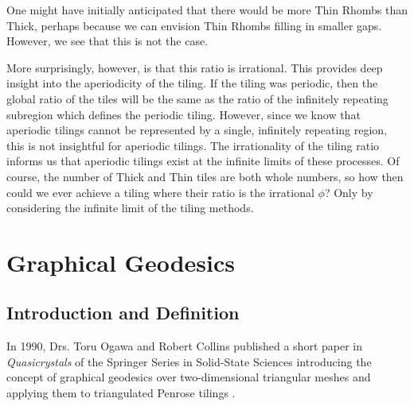 \documentclass[
  oneside,
  11pt, a4paper,
  footinclude=true,
  headinclude=true,
  cleardoublepage=empty
]{scrbook}
\begin{document}
One might have initially anticipated that there would be more Thin Rhombs than Thick, perhaps because we can envision Thin Rhombs filling in smaller gaps. However, we see that this is not the case.

More surprisingly, however, is that this ratio is irrational. This provides deep insight into the aperiodicity of the tiling. If the tiling was periodic, then the global ratio of the tiles will be the same as the ratio of the infinitely repeating subregion which defines the periodic tiling. However, since we know that aperiodic tilings cannot be represented by a single, infinitely repeating region, this is not insightful for aperiodic tilings. The irrationality of the tiling ratio informs us that aperiodic tilings exist at the infinite limits of these processes. Of course, the number of Thick and Thin tiles are both whole numbers, so how then could we ever achieve a tiling where their ratio is the irrational $\phi$? Only by considering the infinite limit of the tiling methods.
\chapter{Graphical Geodesics}
\section{Introduction and Definition}
In 1990, Drs. Toru Ogawa and Robert Collins published a short paper in \textit{Quasicrystals} of the Springer Series in Solid-State Sciences introducing the concept of graphical geodesics over two-dimensional triangular meshes and applying them to triangulated Penrose tilings \cite{Ogawa1999}. 
\end{document}
